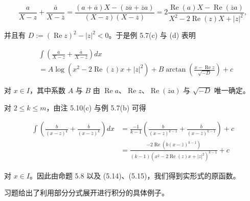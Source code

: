 \[
\frac{a}{X - z} + \frac{\overline{a}}{X - \overline{z}} = \frac{(a + \overline{a})X - (z\overline{a} + \overline{z}a)}{(X - z)(X - \overline{z})} = 2 \frac{\operatorname{Re}(a)X - \operatorname{Re}(\overline{z}a)}{X^2 - 2\operatorname{Re}(z)X + |z|^2} ,
\]

并且有 $ D := (\operatorname{Re} z)^2 - |z|^2 < 0 $。于是例 5.7(c) 与 (d) 表明

\begin{equation}
\begin{aligned}
&\int \left( \frac{a}{X - z} + \frac{\overline{a}}{X - \overline{z}} \right) dx \\ &= A \log(x^2 - 2\operatorname{Re}(z)x + |z|^2) + B \arctan\left( \frac{x - \operatorname{Re} z}{\sqrt{-D}} \right) + c
\end{aligned}\tag{5.14}
\end{equation}

对 $ x \in I $，其中系数 $ A $ 与 $ B $ 由 $ \operatorname{Re} a $、$ \operatorname{Re} z $、$ \operatorname{Re}(\overline{z}a) $ 与 $ \sqrt{-D} $ 唯一确定。

对 $ 2 \le k \le m $，由注 5.10(c) 与例 5.7(b) 可得

\begin{equation}
\begin{aligned}
\int \left( \frac{b}{(x - z)^k} + \frac{\overline{b}}{(x - \overline{z})^k} \right) dx &= \frac{-1}{k-1} \left( \frac{b}{(x - z)^{k-1}} + \frac{\overline{b}}{(x - \overline{z})^{k-1}} \right) + c \\ &= \frac{-2 \operatorname{Re}(b (x - \overline{z})^{k-1})}{(k-1)(x^2 - 2\operatorname{Re}(z)x + |z|^2)^{k-1}} + c
\end{aligned}\tag{5.15}
\end{equation}

对 $ x \in I $。因此由命题 5.8 以及 (5.14)、(5.15)，我们得到实形式的原函数。

习题给出了利用部分分式展开进行积分的具体例子。

\exerciseshead

